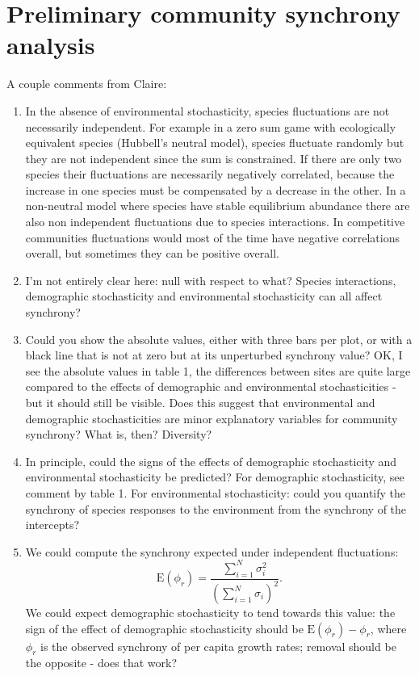 \documentclass[12pt,]{article}
\title{}
\author{}
\date{}
\begin{document}
\maketitle


\section{Preliminary community synchrony
analysis}\label{preliminary-community-synchrony-analysis}

A couple comments from Claire:

\begin{enumerate}
\def\labelenumi{\arabic{enumi}.}
\item
  In the absence of environmental stochasticity, species fluctuations
  are not necessarily independent. For example in a zero sum game with
  ecologically equivalent species (Hubbell's neutral model), species
  fluctuate randomly but they are not independent since the sum is
  constrained. If there are only two species their fluctuations are
  necessarily negatively correlated, because the increase in one species
  must be compensated by a decrease in the other. In a non-neutral model
  where species have stable equilibrium abundance there are also non
  independent fluctuations due to species interactions. In competitive
  communities fluctuations would most of the time have negative
  correlations overall, but sometimes they can be positive overall.
\item
  I'm not entirely clear here: null with respect to what? Species
  interactions, demographic stochasticity and environmental
  stochasticity can all affect synchrony?
\item
  Could you show the absolute values, either with three bars per plot,
  or with a black line that is not at zero but at its unperturbed
  synchrony value? OK, I see the absolute values in table 1, the
  differences between sites are quite large compared to the effects of
  demographic and environmental stochasticities - but it should still be
  visible. Does this suggest that environmental and demographic
  stochasticities are minor explanatory variables for community
  synchrony? What is, then? Diversity?
\item
  In principle, could the signs of the effects of demographic
  stochasticity and environmental stochasticity be predicted? For
  demographic stochasticity, see comment by table 1. For environmental
  stochasticity: could you quantify the synchrony of species responses
  to the environment from the synchrony of the intercepts?
\item
  We could compute the synchrony expected under independent
  fluctuations:
  \[\text{E}(\phi_{r}) = \frac{ \sum_{i=1}^{N}{\sigma_{i}^2} } { \left(\sum_{i=1}^{N}{\sigma_{i}} \right)^2 }.\]
  We could expect demographic stochasticity to tend towards this value:
  the sign of the effect of demographic stochasticity should be
  \(\text{E}(\phi_{r}) - \phi_{r}\), where \(\phi_{r}\) is the observed
  synchrony of per capita growth rates; removal should be the opposite -
  does that work?
\end{enumerate}
\end{document}
